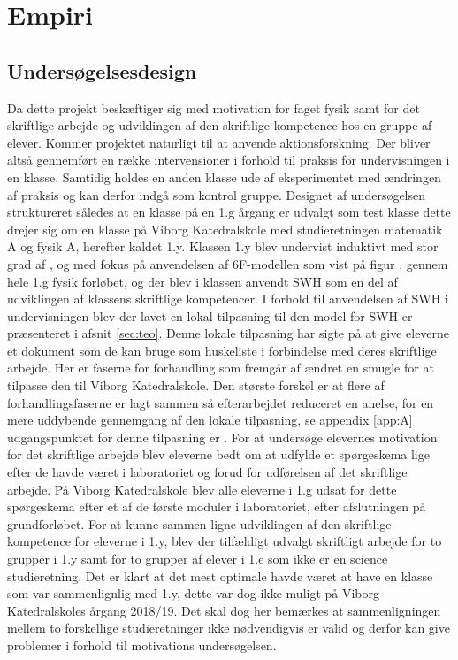 \chapter{Empiri}
\label{Ch:3}

\section{Undersøgelsesdesign}
\label{sec:und}
Da dette projekt beskæftiger sig med motivation for faget fysik samt for det skriftlige arbejde og udviklingen af den skriftlige kompetence hos en gruppe af elever. Kommer projektet naturligt til at anvende aktionsforskning. Der bliver altså gennemført en række intervensioner i forhold til praksis for undervisningen i en klasse. Samtidig holdes en anden klasse ude af eksperimentet med ændringen af praksis og kan derfor indgå som kontrol gruppe. Designet af undersøgelsen struktureret således at en klasse på en 1.g årgang er udvalgt som test klasse dette drejer sig om en klasse på Viborg Katedralskole med studieretningen matematik A og fysik A, herefter kaldet 1.y. Klassen 1.y blev undervist induktivt med stor grad af \ib{}, og med fokus på anvendelsen af 6F-modellen som vist på figur  , gennem hele 1.g fysik forløbet, og der blev i klassen anvendt SWH som en del af udviklingen af klassens skriftlige kompetencer. I forhold til anvendelsen af SWH i undervisningen blev der lavet en lokal tilpasning til den model for SWH er præsenteret i afsnit \vref{sec:teo}. Denne lokale tilpasning har sigte på at give eleverne et dokument som de kan bruge som huskeliste i forbindelse med deres skriftlige arbejde. Her er faserne for forhandling som fremgår af  ændret en smugle for at tilpasse den til Viborg Katedralskole. Den største forskel er at flere af forhandlingsfaserne er lagt sammen så efterarbejdet reduceret en anelse, for en mere uddybende gennemgang af den lokale tilpasning, se appendix \vref{app:A} udgangspunktet for denne tilpasning er \citep{Greenbowe2005, Hand2004, Krogh2016}. For at undersøge elevernes motivation for det skriftlige arbejde blev eleverne bedt om at udfylde et spørgeskema lige efter de havde været i laboratoriet og forud for udførelsen af det skriftlige arbejde. På Viborg Katedralskole blev alle eleverne i 1.g udsat for dette spørgeskema efter et af de første moduler i laboratoriet, efter afslutningen på grundforløbet. 
For at kunne sammen ligne udviklingen af den skriftlige kompetence for eleverne i 1.y, blev der tilfældigt udvalgt skriftligt arbejde for to grupper i 1.y samt for to grupper af elever i 1.e som ikke er en science studieretning. Det er klart at det mest optimale havde været at have en klasse som var sammenlignlig med 1.y, dette var dog ikke muligt på Viborg Katedralskoles årgang 2018/19. Det skal dog her bemærkes at sammenligningen mellem to forskellige studieretninger ikke nødvendigvis er valid og derfor kan give problemer i forhold til motivations undersøgelsen.

